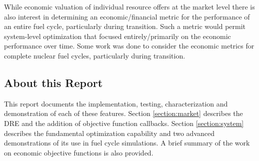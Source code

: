 While economic valuation of individual resource offers at the market level
there is also interest in determining an economic/financial metric for the
performance of an entire fuel cycle, particularly during transition.  Such a
metric would permit system-level optimization that focused entirely/primarily
on the economic performance over time.  Some work was done to consider the
economic metrics for complete nuclear fuel cycles, particularly during
transition.

\subsection{About this Report}

This report documents the implementation, testing, characterization and
demonstration of each of these features.  Section \ref{section:market}
describes the \gls{DRE} and the addition of objective function callbacks.
Section \ref{section:system} describes the fundamental optimization capability
and two advanced demonstrations of its use in fuel cycle simulations.  A brief
summary of the work on economic objective functions is also provided.

